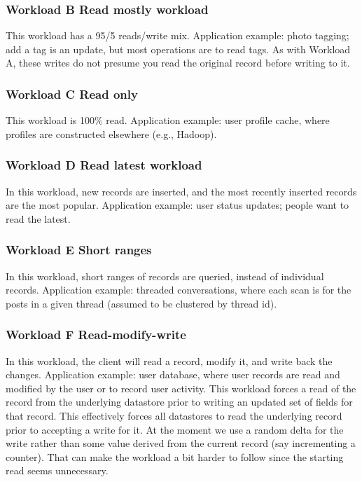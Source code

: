 \documentclass[journal]{IEEEtran}
\begin{document}
\subsubsection{Workload B Read mostly workload}

This workload has a 95/5 reads/write mix. Application example: photo tagging; add a tag is an update, but most operations are to read tags. As with Workload A, these writes do not presume you read the original record before writing to it.

\subsubsection{Workload C Read only}


This workload is 100\% read. Application example: user profile cache, where profiles are constructed elsewhere (e.g., Hadoop).


\subsubsection{Workload D Read latest workload}


In this workload, new records are inserted, and the most recently inserted records are the most popular. Application example: user status updates; people want to read the latest.


\subsubsection{Workload E Short ranges}


In this workload, short ranges of records are queried, instead of individual records. Application example: threaded conversations, where each scan is for the posts in a given thread (assumed to be clustered by thread id).

\subsubsection{Workload F Read-modify-write}

In this workload, the client will read a record, modify it, and write back the changes. Application example: user database, where user records are read and modified by the user or to record user activity. This workload forces a read of the record from the underlying datastore prior to writing an updated set of fields for that record. This effectively forces all datastores to read the underlying record prior to accepting a write for it. At the moment we use a random delta for the write rather than some value derived from the current record (say incrementing a counter). That can make the workload a bit harder to follow since the starting read seems unnecessary.
\end{document}
